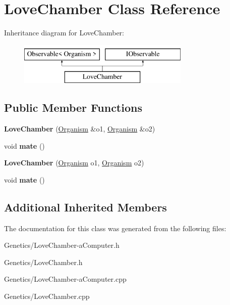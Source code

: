 \hypertarget{class_love_chamber}{}\section{Love\+Chamber Class Reference}
\label{class_love_chamber}
Inheritance diagram for Love\+Chamber\+:\begin{figure}[H]
\begin{center}
\leavevmode
\includegraphics[height=2.000000cm]{class_love_chamber}
\end{center}
\end{figure}
\subsection*{Public Member Functions}
\begin{DoxyCompactItemize}
\item 
{\bfseries Love\+Chamber} (\hyperlink{class_organism}{Organism} \&o1, \hyperlink{class_organism}{Organism} \&o2)\hypertarget{class_love_chamber_a4f157ceb83d8b719de1ae69c6b88c555}{}\label{class_love_chamber_a4f157ceb83d8b719de1ae69c6b88c555}

\item 
void {\bfseries mate} ()\hypertarget{class_love_chamber_acdb1a279b4b6edfd8d38375c4faee182}{}\label{class_love_chamber_acdb1a279b4b6edfd8d38375c4faee182}

\item 
{\bfseries Love\+Chamber} (\hyperlink{class_organism}{Organism} o1, \hyperlink{class_organism}{Organism} o2)\hypertarget{class_love_chamber_afd8934456036b6252e0e968c26ffb04e}{}\label{class_love_chamber_afd8934456036b6252e0e968c26ffb04e}

\item 
void {\bfseries mate} ()\hypertarget{class_love_chamber_acdb1a279b4b6edfd8d38375c4faee182}{}\label{class_love_chamber_acdb1a279b4b6edfd8d38375c4faee182}

\end{DoxyCompactItemize}
\subsection*{Additional Inherited Members}


The documentation for this class was generated from the following files\+:\begin{DoxyCompactItemize}
\item 
Genetics/Love\+Chamber-\/a\+Computer.\+h\item 
Genetics/Love\+Chamber.\+h\item 
Genetics/Love\+Chamber-\/a\+Computer.\+cpp\item 
Genetics/Love\+Chamber.\+cpp\end{DoxyCompactItemize}

